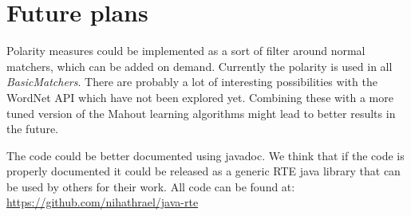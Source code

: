 \section{Future plans}
Polarity measures could be implemented as a sort of filter around normal matchers, which can be added on demand.
Currently the polarity is used in all \textit{BasicMatchers}.
There are probably a lot of interesting possibilities with the WordNet API which have not been explored yet. Combining
these with a more tuned version of the Mahout learning algorithms might lead to better results in the future.

The code could be better documented using javadoc. We think that if the code is properly documented it could be released as a generic RTE java library that can be used by
others for their work. All code can be found at: \url{https://github.com/nihathrael/java-rte}

